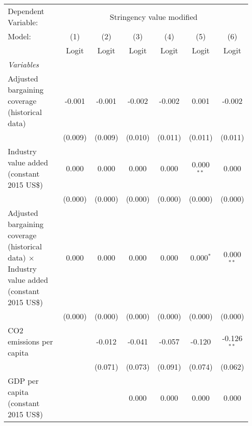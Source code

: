 
\begingroup
\centering
\begin{tabular}{lcccccc}
   \toprule
   Dependent Variable: & \multicolumn{6}{c}{Stringency value modified}\\
   Model:                                                                                              & (1)     & (2)     & (3)     & (4)     & (5)          & (6)\\  
                                                                                                       &  Logit  & Logit   & Logit   & Logit   & Logit        & Logit\\  
   \midrule
   \emph{Variables}\\
   Adjusted bargaining coverage (historical data)                                                      & -0.001  & -0.001  & -0.002  & -0.002  & 0.001        & -0.002\\   
                                                                                                       & (0.009) & (0.009) & (0.010) & (0.011) & (0.011)      & (0.011)\\   
   Industry value added (constant 2015 US\$)                                                           & 0.000   & 0.000   & 0.000   & 0.000   & 0.000$^{**}$ & 0.000\\   
                                                                                                       & (0.000) & (0.000) & (0.000) & (0.000) & (0.000)      & (0.000)\\   
   Adjusted bargaining coverage (historical data) $\times$ Industry value added (constant 2015 US\$)   & 0.000   & 0.000   & 0.000   & 0.000   & 0.000$^{*}$  & 0.000$^{**}$\\   
                                                                                                       & (0.000) & (0.000) & (0.000) & (0.000) & (0.000)      & (0.000)\\   
   CO2 emissions per capita                                                                            &         & -0.012  & -0.041  & -0.057  & -0.120       & -0.126$^{**}$\\   
                                                                                                       &         & (0.071) & (0.073) & (0.091) & (0.074)      & (0.062)\\   
   GDP per capita (constant 2015 US\$)                                                                 &         &         & 0.000   & 0.000   & 0.000        & 0.000\\   

\end{tabular}
